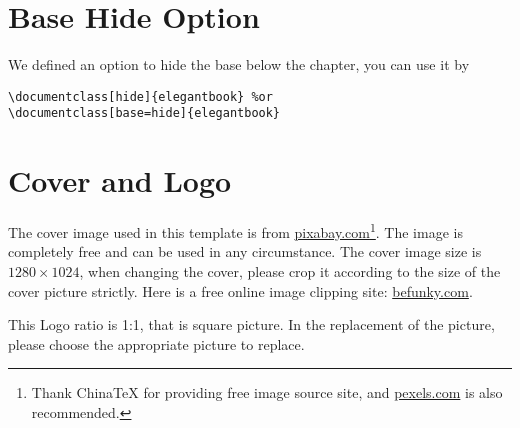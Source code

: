 \documentclass[noanswer,fancy,blue,11pt,hide]{elegantbook}
\begin{document}
\section{Base Hide Option}
We defined an option to hide the base below the chapter, you can use it by
\begin{lstlisting}
\documentclass[hide]{elegantbook} %or
\documentclass[base=hide]{elegantbook}
\end{lstlisting}


\section{Cover and Logo}

The cover image used in this template is from \href{https://pixabay.com/en/tea-time-poetry-coffee-reading-3240766/}{pixabay.com}\footnote{Thank China\TeX{} for providing free image source site, and \href{https://www.pexels.com/}{pexels.com} is also recommended.}. The image is completely free and can be used in any circumstance. The cover image size is $1280 \times 1024$, when changing the cover, please crop it according to the size of the cover picture strictly. Here is a free online image clipping site: \href{https://www.befunky.com/create/crop-photo/}{befunky.com}.

This Logo ratio is 1:1, that is square picture. In the replacement of the picture, please choose the appropriate picture to replace.
\end{document}
